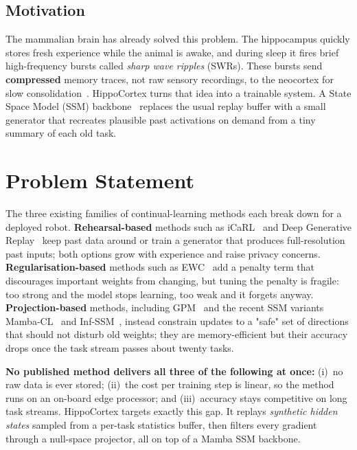 \documentclass[11pt,a4paper]{article}
\begin{document}
\subsection{Motivation}
The mammalian brain has already solved this problem. The hippocampus quickly stores fresh experience while the animal is awake, and during sleep it fires brief high-frequency bursts called \emph{sharp wave ripples} (SWRs). These bursts send \textbf{compressed} memory traces, not raw sensory recordings, to the neocortex for slow consolidation~\citep{buzsaki2015hippocampal,mcclelland1995complementary}. HippoCortex turns that idea into a trainable system. A State Space Model (SSM) backbone~\citep{gu2023mamba} replaces the usual replay buffer with a small generator that recreates plausible past activations on demand from a tiny summary of each old task.

\section{Problem Statement}

The three existing families of continual-learning methods each break down for a deployed robot. \textbf{Rehearsal-based} methods such as iCaRL~\citep{rebuffi2017icarl} and Deep Generative Replay~\citep{shin2017continual} keep past data around or train a generator that produces full-resolution past inputs; both options grow with experience and raise privacy concerns. \textbf{Regularisation-based} methods such as EWC~\citep{kirkpatrick2017overcoming} add a penalty term that discourages important weights from changing, but tuning the penalty is fragile: too strong and the model stops learning, too weak and it forgets anyway. \textbf{Projection-based} methods, including GPM~\citep{saha2021gradient} and the recent SSM variants Mamba-CL~\citep{cheng2024mambacl} and Inf-SSM~\citep{lee2025exemplarfree}, instead constrain updates to a "safe" set of directions that should not disturb old weights; they are memory-efficient but their accuracy drops once the task stream passes about twenty tasks.

\textbf{No published method delivers all three of the following at once:} (i)~no raw data is ever stored; (ii)~the cost per training step is linear, so the method runs on an on-board edge processor; and (iii)~accuracy stays competitive on long task streams. HippoCortex targets exactly this gap. It replays \emph{synthetic hidden states} sampled from a per-task statistics buffer, then filters every gradient through a null-space projector, all on top of a Mamba SSM backbone.
\end{document}

